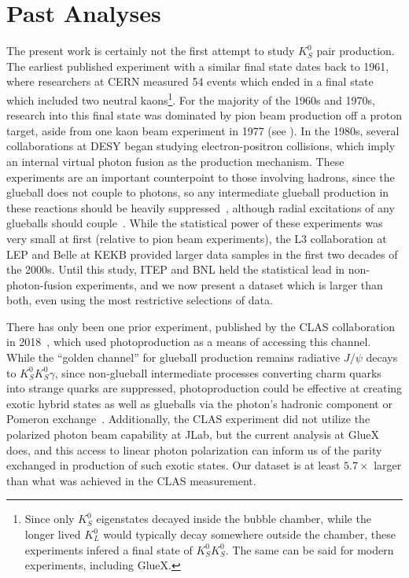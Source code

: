 \section{Past Analyses}\label{sec:past-analyses}
The present work is certainly not the first attempt to study $K_S^0$ pair production. The earliest published experiment with a similar final state dates back to 1961, where researchers at CERN measured 54 events which ended in a final state which included two neutral kaons\footnote{Since only $K_S^0$ eigenstates decayed inside the bubble chamber, while the longer lived $K_L^0$ would typically decay somewhere outside the chamber, these experiments infered a final state of $K_S^0K_S^0$. The same can be said for modern experiments, including GlueX.}. For the majority of the 1960s and 1970s, research into this final state was dominated by pion beam production off a proton target, aside from one kaon beam experiment in 1977 (see ). In the 1980s, several collaborations at DESY began studying electron-positron collisions, which imply an internal virtual photon fusion as the production mechanism. These experiments are an important counterpoint to those involving hadrons, since the glueball does not couple to photons, so any intermediate glueball production in these reactions should be heavily suppressed~\cite{Acciarri2001}, although radial excitations of any glueballs should couple~\cite{Mathieu2009}. While the statistical power of these experiments was very small at first (relative to pion beam experiments), the L3 collaboration at LEP and Belle at KEKB provided larger data samples in the first two decades of the 2000s. Until this study, ITEP and BNL held the statistical lead in non-photon-fusion experiments, and we now present a dataset which is larger than both, even using the most restrictive selections of data.

There has only been one prior experiment, published by the CLAS collaboration in 2018~\cite{Chandavar2018}, which used photoproduction as a means of accessing this channel. While the ``golden channel'' for glueball production remains radiative $J/\psi$ decays to $K_S^0K_S^0\gamma$, since non-glueball intermediate processes converting charm quarks into strange quarks are suppressed, photoproduction could be effective at creating exotic hybrid states as well as glueballs via the photon's hadronic component or Pomeron exchange~\cite{Mathieu2009}. Additionally, the CLAS experiment did not utilize the polarized photon beam capability at JLab, but the current analysis at GlueX does, and this access to linear photon polarization can inform us of the parity exchanged in production of such exotic states. Our dataset is at least $5.7\times$ larger than what was achieved in the CLAS measurement.

